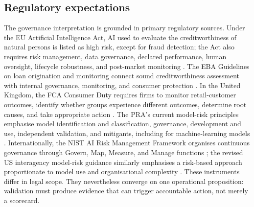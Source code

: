 \documentclass[10pt]{article}
\begin{document}
\subsection{Regulatory expectations}

The governance interpretation is grounded in primary regulatory sources. Under the EU Artificial Intelligence Act, AI used to evaluate the creditworthiness of natural persons is listed as high risk, except for fraud detection; the Act also requires risk management, data governance, declared performance, human oversight, lifecycle robustness, and post-market monitoring \cite{ref40}. The EBA Guidelines on loan origination and monitoring connect sound creditworthiness assessment with internal governance, monitoring, and consumer protection \cite{ref44}. In the United Kingdom, the FCA Consumer Duty requires firms to monitor retail-customer outcomes, identify whether groups experience different outcomes, determine root causes, and take appropriate action \cite{ref46}. The PRA's current model-risk principles emphasise model identification and classification, governance, development and use, independent validation, and mitigants, including for machine-learning models \cite{ref45}. Internationally, the NIST AI Risk Management Framework organises continuous governance through Govern, Map, Measure, and Manage functions \cite{ref39}; the revised US interagency model-risk guidance similarly emphasises a risk-based approach proportionate to model use and organisational complexity \cite{ref47}. These instruments differ in legal scope. They nevertheless converge on one operational proposition: validation must produce evidence that can trigger accountable action, not merely a scorecard.
\end{document}
